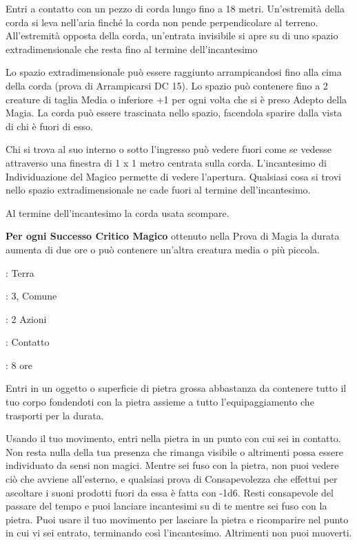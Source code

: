 \begin{multicols}{2}
Entri a contatto con un pezzo di corda lungo fino a 18 metri. Un'estremità della corda si leva nell'aria finché la corda non pende perpendicolare al terreno. All'estremità opposta della corda, un'entrata invisibile si apre su di uno spazio extradimensionale che resta fino al termine dell'incantesimo

Lo spazio extradimensionale può essere raggiunto arrampicandosi fino alla cima della corda (prova di Arrampicarsi DC 15). Lo spazio può contenere fino a 2 creature di taglia Media o inferiore +1 per ogni volta che si è preso Adepto della Magia. La corda può essere trascinata nello spazio, facendola sparire dalla vista di chi è fuori di esso.

Chi si trova al suo interno o sotto l'ingresso può vedere fuori come se vedesse attraverso una finestra di 1 x 1 metro centrata sulla corda. L'incantesimo di Individuazione del Magico permette di vedere l'apertura. Qualsiasi cosa si trovi nello spazio extradimensionale ne cade fuori al termine dell'incantesimo.

Al termine dell'incantesimo la corda usata scompare.

\textbf{Per ogni Successo Critico Magico} ottenuto nella Prova di Magia la durata aumenta di due ore o può contenere un'altra creatura media o più piccola.

\noindent\colorbox{OBSSgold!10}{
\begin{minipage}{0.95\linewidth}
\begin{description}[noitemsep, topsep=0pt, parsep=0pt, partopsep=0pt, leftmargin=0cm, labelwidth=1.3cm]
	\item[\textbf{Lista}]: Terra
	\item[\textbf{Livello}]: 3, Comune
	\item[\textbf{Lancio}]: 2 Azioni
	\item[\textbf{Gittata}]: Contatto
	\item[\textbf{Durata}]: 8 ore
\end{description}
\end{minipage}}\smallskip

Entri in un oggetto o superficie di pietra grossa abbastanza da contenere tutto il tuo corpo fondendoti con la pietra assieme a tutto l'equipaggiamento che trasporti per la durata.

Usando il tuo movimento, entri nella pietra in un punto con cui sei in contatto. Non resta nulla della tua presenza che rimanga visibile o altrimenti possa essere individuato da sensi non magici. Mentre sei fuso con la pietra, non puoi vedere ciò che avviene all'esterno, e qualsiasi prova di Consapevolezza che effettui per ascoltare i suoni prodotti fuori da essa è fatta con -1d6. Resti consapevole del passare del tempo e puoi lanciare incantesimi su di te mentre sei fuso con la pietra. Puoi usare il tuo movimento per lasciare la pietra e ricomparire nel punto in cui vi sei entrato, terminando così l'incantesimo. Altrimenti non puoi muoverti.


\end{multicols}
